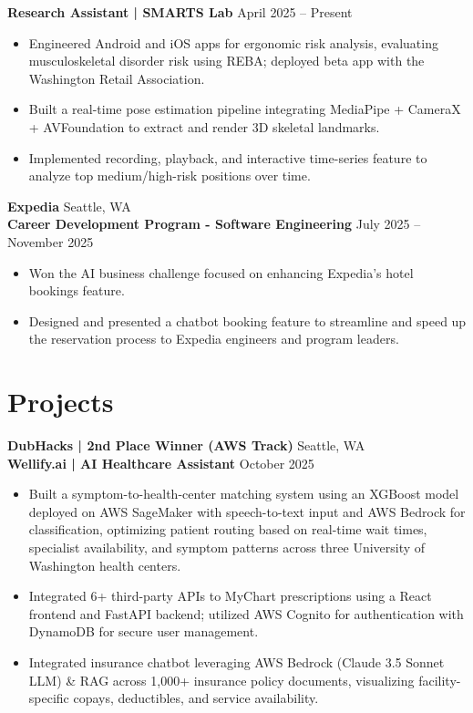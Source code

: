 \documentclass[11pt]{article}
\begin{document}
\textbf{Research Assistant | SMARTS Lab} \hfill April 2025 -- Present
\begin{itemize}
    \item Engineered Android and iOS apps for ergonomic risk analysis, evaluating musculoskeletal disorder risk using REBA; deployed beta app with the Washington Retail Association.
    \item Built a real-time pose estimation pipeline integrating MediaPipe + CameraX + AVFoundation to extract and render 3D skeletal landmarks.
    \item Implemented recording, playback, and interactive time-series feature to analyze top medium/high-risk positions over time.
\end{itemize}

\textbf{Expedia} \hfill Seattle, WA \\
\textbf{Career Development Program - Software Engineering} \hfill July 2025 -- November 2025
\begin{itemize}
    \item Won the AI business challenge focused on enhancing Expedia’s hotel bookings feature.
    \item Designed and presented a chatbot booking feature to streamline and speed up the reservation process to Expedia engineers and program leaders.
\end{itemize}

\vspace{0.15in}

\section*{Projects}

\textbf{DubHacks | 2nd Place Winner (AWS Track)} \hfill Seattle, WA \\
\textbf{Wellify.ai | AI Healthcare Assistant} \hfill October 2025
\begin{itemize}
    \item Built a symptom-to-health-center matching system using an XGBoost model deployed on AWS SageMaker with speech-to-text input and AWS Bedrock for classification, optimizing patient routing based on real-time wait times, specialist availability, and symptom patterns across three University of Washington health centers.
    \item Integrated 6+ third-party APIs to MyChart prescriptions using a React frontend and FastAPI backend; utilized AWS Cognito for authentication with DynamoDB for secure user management.
    \item Integrated insurance chatbot leveraging AWS Bedrock (Claude 3.5 Sonnet LLM) \& RAG across 1,000+ insurance policy documents, visualizing facility-specific copays, deductibles, and service availability.
\end{itemize}
\end{document}
